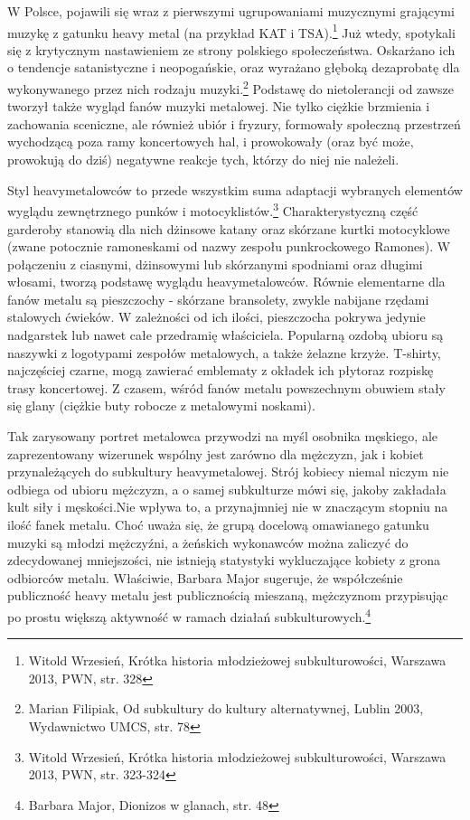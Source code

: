 \documentclass[12pt, a4paper, titlepage]{report}
\begin{document}
W Polsce, pojawili się wraz z pierwszymi ugrupowaniami muzycznymi grającymi muzykę z gatunku heavy metal (na przykład KAT i TSA).\footnote{Witold Wrzesień, Krótka historia młodzieżowej subkulturowości, Warszawa 2013, PWN, str. 328} Już wtedy, spotykali się z krytycznym nastawieniem ze strony polskiego społeczeństwa. Oskarżano ich o tendencje satanistyczne i neopogańskie, oraz wyrażano głęboką dezaprobatę dla wykonywanego przez nich rodzaju muzyki.\footnote{Marian Filipiak, Od subkultury do kultury alternatywnej, Lublin 2003, Wydawnictwo UMCS, str. 78} %
Podstawę do nietolerancji od zawsze tworzył także wygląd fanów muzyki metalowej. Nie tylko ciężkie brzmienia i zachowania sceniczne, ale również ubiór i fryzury, formowały społeczną przestrzeń wychodzącą poza ramy koncertowych hal, i prowokowały (oraz być może, prowokują do dziś) negatywne reakcje tych, którzy do niej nie należeli. 
 
Styl heavymetalowców to przede wszystkim suma adaptacji wybranych elementów wyglądu zewnętrznego punków i motocyklistów.\footnote{Witold Wrzesień, Krótka historia młodzieżowej subkulturowości, Warszawa 2013, PWN, \break str. 323-324} Charakterystyczną \break część garderoby stanowią dla nich dżinsowe katany oraz skórzane kurtki motocyklowe (zwane potocznie ramoneskami od nazwy zespołu punkrockowego Ramones). W połączeniu z ciasnymi, dżinsowymi lub skórzanymi spodniami oraz długimi włosami, tworzą podstawę wyglądu heavymetalowców. Równie elementarne dla fanów metalu są pieszczochy - skórzane bransolety, zwykle nabijane rzędami stalowych ćwieków. W zależności od ich ilości, pieszczocha pokrywa jedynie nadgarstek lub nawet całe przedramię właściciela. Popularną ozdobą ubioru są naszywki z logotypami zespołów metalowych, a także żelazne krzyże. T-shirty, najczęściej czarne, mogą zawierać emblematy z okładek ich płyt\footnotemark[\value{footnote}] oraz rozpiskę trasy koncertowej. %
Z czasem, wśród fanów metalu powszechnym obuwiem stały się glany (ciężkie buty robocze z metalowymi noskami). 

Tak zarysowany portret metalowca przywodzi na myśl osobnika męskiego,  ale zaprezentowany wizerunek wspólny jest zarówno dla mężczyzn, jak i kobiet przynależących do subkultury heavymetalowej. Strój kobiecy niemal niczym nie odbiega od ubioru mężczyzn, a o samej subkulturze mówi się, jakoby zakładała kult siły i męskości.\footnotemark[\value{footnote}] Nie wpływa to, a przynajmniej nie w znaczącym stopniu na ilość fanek metalu. Choć uważa się, że grupą docelową omawianego gatunku muzyki są młodzi mężczyźni, a żeńskich wykonawców można zaliczyć do zdecydowanej mniejszości, nie istnieją statystyki wykluczające kobiety z grona odbiorców metalu. Właściwie, Barbara Major sugeruje, że współcześnie publiczność heavy metalu jest publicznością mieszaną, mężczyznom przypisując po prostu większą aktywność w ramach działań subkulturowych.\footnote{Barbara Major, Dionizos w glanach, str. 48} 
\end{document}
